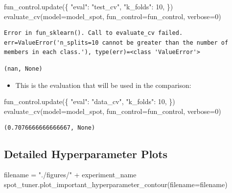 \documentclass[
  letterpaper,
  DIV=11,
  numbers=noendperiod]{scrreprt}
\newenvironment{Shaded}{\begin{snugshade}}{\end{snugshade}}
\newcommand{\DecValTok}[1]{\textcolor[rgb]{0.68,0.00,0.00}{#1}}
\newcommand{\NormalTok}[1]{\textcolor[rgb]{0.00,0.23,0.31}{#1}}
\newcommand{\OperatorTok}[1]{\textcolor[rgb]{0.37,0.37,0.37}{#1}}
\newcommand{\StringTok}[1]{\textcolor[rgb]{0.13,0.47,0.30}{#1}}
\providecommand{\tightlist}{%
  \setlength{\itemsep}{0pt}\setlength{\parskip}{0pt}}\usepackage{longtable,booktabs,array}
\begin{document}
\begin{Shaded}
\begin{Highlighting}[]
\NormalTok{fun\_control.update(\{}
     \StringTok{"eval"}\NormalTok{: }\StringTok{"test\_cv"}\NormalTok{,}
     \StringTok{"k\_folds"}\NormalTok{: }\DecValTok{10}\NormalTok{,}
\NormalTok{\})}
\NormalTok{evaluate\_cv(model}\OperatorTok{=}\NormalTok{model\_spot, fun\_control}\OperatorTok{=}\NormalTok{fun\_control, verbose}\OperatorTok{=}\DecValTok{0}\NormalTok{)}
\end{Highlighting}
\end{Shaded}

\begin{verbatim}
Error in fun_sklearn(). Call to evaluate_cv failed. err=ValueError('n_splits=10 cannot be greater than the number of members in each class.'), type(err)=<class 'ValueError'>
\end{verbatim}

\begin{verbatim}
(nan, None)
\end{verbatim}

\begin{itemize}
\tightlist
\item
  This is the evaluation that will be used in the comparison:
\end{itemize}

\begin{Shaded}
\begin{Highlighting}[]
\NormalTok{fun\_control.update(\{}
     \StringTok{"eval"}\NormalTok{: }\StringTok{"data\_cv"}\NormalTok{,}
     \StringTok{"k\_folds"}\NormalTok{: }\DecValTok{10}\NormalTok{,}
\NormalTok{\})}
\NormalTok{evaluate\_cv(model}\OperatorTok{=}\NormalTok{model\_spot, fun\_control}\OperatorTok{=}\NormalTok{fun\_control, verbose}\OperatorTok{=}\DecValTok{0}\NormalTok{)}
\end{Highlighting}
\end{Shaded}

\begin{verbatim}
(0.7076666666666667, None)
\end{verbatim}

\hypertarget{detailed-hyperparameter-plots-4}{%
\subsection{Detailed Hyperparameter
Plots}\label{detailed-hyperparameter-plots-4}}

\begin{Shaded}
\begin{Highlighting}[]
\NormalTok{filename }\OperatorTok{=} \StringTok{"./figures/"} \OperatorTok{+}\NormalTok{ experiment\_name}
\NormalTok{spot\_tuner.plot\_important\_hyperparameter\_contour(filename}\OperatorTok{=}\NormalTok{filename)}
\end{Highlighting}
\end{Shaded}
\end{document}
